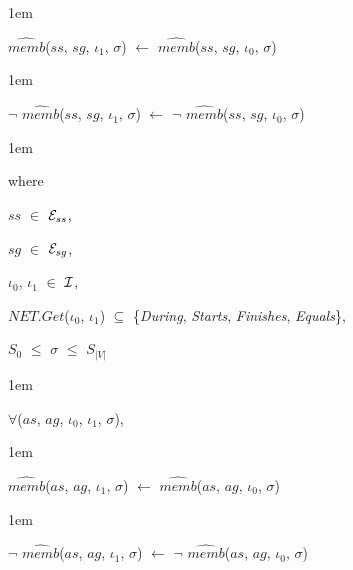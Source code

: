\documentclass[11pt]{report}
\newenvironment{vquote}
{
  \begin{list}{}{\leftmargin 1em}\item[]
}
{
  \end{list}
}
\begin{document}
\begin{enumerate}
                \begin{vquote}
                  $\hat{memb}$($ss$, $sg$, $\iota_1$, $\sigma$)
                  $\leftarrow$
                  $\hat{memb}$($ss$, $sg$, $\iota_0$, $\sigma$)
                \end{vquote}

                \begin{vquote}
                  $\lnot$ $\hat{memb}$($ss$, $sg$, $\iota_1$, $\sigma$)
                  $\leftarrow$
                  $\lnot$ $\hat{memb}$($ss$, $sg$, $\iota_0$, $\sigma$)
                \end{vquote}

                \begin{vquote}
                  where

                  \hspace{1em}
                  $ss$ $\in$ ${\cal E}_{ss}$,

                  \hspace{1em}
                  $sg$ $\in$ ${\cal E}_{sg}$,

                  \hspace{1em}
                  $\iota_0$, $\iota_1$ $\in$ ${\cal I}$,

                  \hspace{1em}
                  $NET.Get$($\iota_0$, $\iota_1$) $\subseteq$
                  \{{\em During}, {\em Starts}, {\em Finishes}, {\em Equals}\},

                  \hspace{1em}
                  $S_0$ $\leq$ $\sigma$ $\leq$ $S_{|V|}$
                \end{vquote}

                \vspace{0.5em}

                \begin{vquote}
                  $\forall$($as$, $ag$, $\iota_0$, $\iota_1$, $\sigma$),
                \end{vquote}

                \begin{vquote}
                  $\hat{memb}$($as$, $ag$, $\iota_1$, $\sigma$)
                  $\leftarrow$
                  $\hat{memb}$($as$, $ag$, $\iota_0$, $\sigma$)
                \end{vquote}

                \begin{vquote}
                  $\lnot$ $\hat{memb}$($as$, $ag$, $\iota_1$, $\sigma$)
                  $\leftarrow$
                  $\lnot$ $\hat{memb}$($as$, $ag$, $\iota_0$, $\sigma$)
                \end{vquote}


\end{enumerate}
\end{document}
